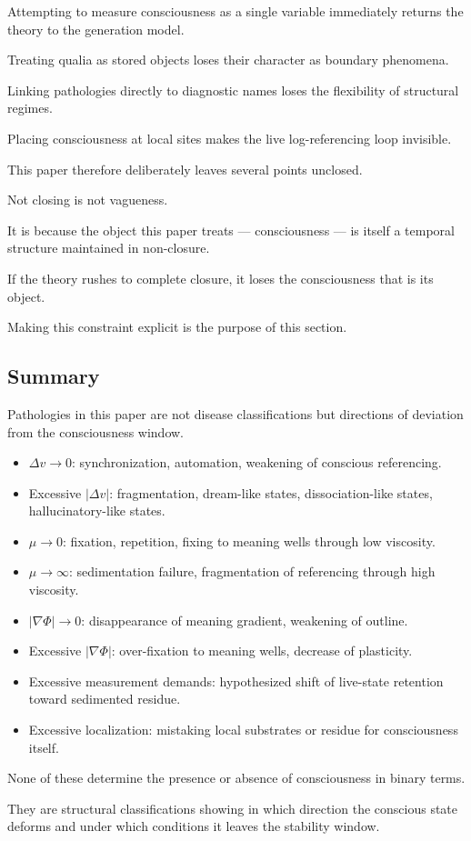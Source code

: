 Attempting to measure consciousness as a single variable immediately returns the theory to the generation model.

Treating qualia as stored objects loses their character as boundary phenomena.

Linking pathologies directly to diagnostic names loses the flexibility of structural regimes.

Placing consciousness at local sites makes the live log-referencing loop invisible.

This paper therefore deliberately leaves several points unclosed.

Not closing is not vagueness.

It is because the object this paper treats — consciousness — is itself a temporal structure maintained in non-closure.

If the theory rushes to complete closure, it loses the consciousness that is its object.

Making this constraint explicit is the purpose of this section.

\subsection{Summary}


Pathologies in this paper are not disease classifications but directions of deviation from the consciousness window.

\begin{itemize}
\item $\Delta v \rightarrow 0$: synchronization, automation, weakening of conscious referencing.
\item Excessive $|\Delta v|$: fragmentation, dream-like states, dissociation-like states, hallucinatory-like states.
\item $\mu \rightarrow 0$: fixation, repetition, fixing to meaning wells through low viscosity.
\item $\mu \rightarrow \infty$: sedimentation failure, fragmentation of referencing through high viscosity.
\item $|\nabla\Phi| \rightarrow 0$: disappearance of meaning gradient, weakening of outline.
\item Excessive $|\nabla\Phi|$: over-fixation to meaning wells, decrease of plasticity.
\item Excessive measurement demands: hypothesized shift of live-state retention toward sedimented residue.
\item Excessive localization: mistaking local substrates or residue for consciousness itself.
\end{itemize}

None of these determine the presence or absence of consciousness in binary terms.

They are structural classifications showing in which direction the conscious state deforms and under which conditions it leaves the stability window.
